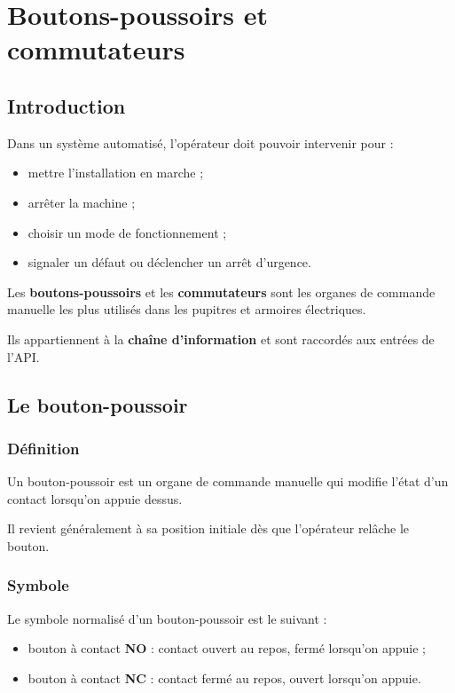 \section{Boutons-poussoirs et commutateurs}

\subsection{Introduction}

Dans un système automatisé, l'opérateur doit pouvoir intervenir pour :

\begin{itemize}
    \item mettre l'installation en marche ;
    \item arrêter la machine ;
    \item choisir un mode de fonctionnement ;
    \item signaler un défaut ou déclencher un arrêt d'urgence.
\end{itemize}

Les \textbf{boutons-poussoirs} et les \textbf{commutateurs} sont les organes de commande manuelle les plus utilisés dans les pupitres et armoires électriques.

Ils appartiennent à la \textbf{chaîne d'information} et sont raccordés aux entrées de l'API.

\subsection{Le bouton-poussoir}

\subsubsection{Définition}

Un bouton-poussoir est un organe de commande manuelle qui modifie l'état d'un contact lorsqu'on appuie dessus.

Il revient généralement à sa position initiale dès que l'opérateur relâche le bouton.

\subsubsection{Symbole}

Le symbole normalisé d'un bouton-poussoir est le suivant :

\begin{itemize}
    \item bouton à contact \textbf{NO} : contact ouvert au repos, fermé lorsqu'on appuie ;
    \item bouton à contact \textbf{NC} : contact fermé au repos, ouvert lorsqu'on appuie.
\end{itemize}

